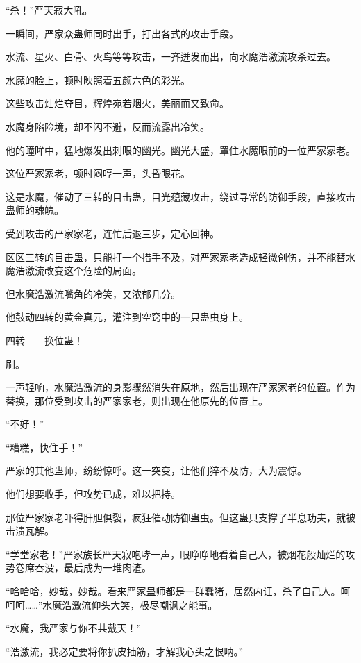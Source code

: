 
\begin{this_body}

“杀！”严天寂大吼。

一瞬间，严家众蛊师同时出手，打出各式的攻击手段。

水流、星火、白骨、火鸟等等攻击，一齐迸发而出，向水魔浩激流攻杀过去。

水魔的脸上，顿时映照着五颜六色的彩光。

这些攻击灿烂夺目，辉煌宛若烟火，美丽而又致命。

水魔身陷险境，却不闪不避，反而流露出冷笑。

他的瞳眸中，猛地爆发出刺眼的幽光。幽光大盛，罩住水魔眼前的一位严家家老。

这位严家家老，顿时闷哼一声，头昏眼花。

这是水魔，催动了三转的目击蛊，目光蕴藏攻击，绕过寻常的防御手段，直接攻击蛊师的魂魄。

受到攻击的严家家老，连忙后退三步，定心回神。

区区三转的目击蛊，只能打一个措手不及，对严家家老造成轻微创伤，并不能替水魔浩激流改变这个危险的局面。

但水魔浩激流嘴角的冷笑，又浓郁几分。

他鼓动四转的黄金真元，灌注到空窍中的一只蛊虫身上。

四转——换位蛊！

刷。

一声轻响，水魔浩激流的身影骤然消失在原地，然后出现在严家家老的位置。作为替换，那位受到攻击的严家家老，则出现在他原先的位置上。

“不好！”

“糟糕，快住手！”

严家的其他蛊师，纷纷惊呼。这一突变，让他们猝不及防，大为震惊。

他们想要收手，但攻势已成，难以把持。

那位严家家老吓得肝胆俱裂，疯狂催动防御蛊虫。但这蛊只支撑了半息功夫，就被击溃瓦解。

“学堂家老！”严家族长严天寂咆哮一声，眼睁睁地看着自己人，被烟花般灿烂的攻势卷席吞没，最后成为一堆肉渣。

“哈哈哈，妙哉，妙哉。看来严家蛊师都是一群蠢猪，居然内讧，杀了自己人。呵呵呵……”水魔浩激流仰头大笑，极尽嘲讽之能事。

“水魔，我严家与你不共戴天！”

“浩激流，我必定要将你扒皮抽筋，才解我心头之恨呐。”


\end{this_body}
